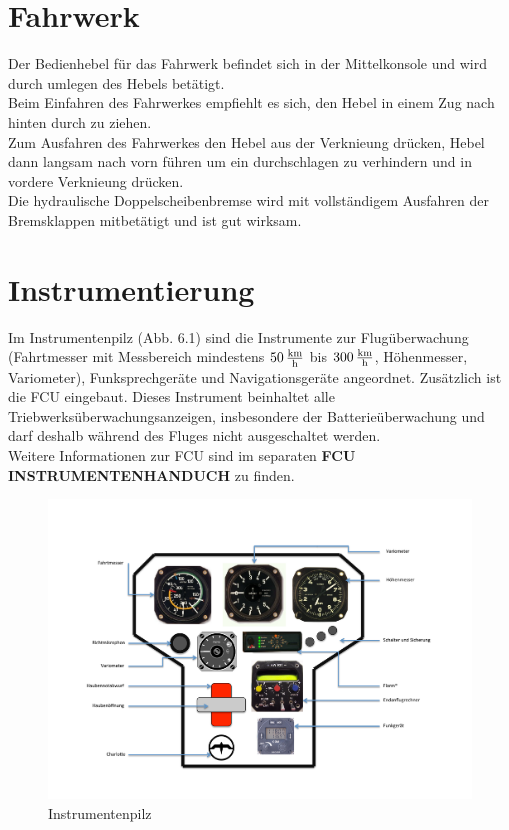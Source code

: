 \section{Fahrwerk}
Der Bedienhebel für das Fahrwerk befindet sich in der Mittelkonsole und wird durch umlegen des Hebels betätigt.\\
Beim Einfahren des Fahrwerkes empfiehlt es sich, den Hebel in einem Zug nach hinten durch zu ziehen.\\
Zum Ausfahren des Fahrwerkes den Hebel aus der Verknieung drücken, Hebel dann langsam nach vorn führen um ein durchschlagen zu verhindern und in vordere Verknieung drücken.\\
Die hydraulische Doppelscheibenbremse wird mit vollständigem Ausfahren der Bremsklappen mitbetätigt und ist gut wirksam.


\section{Instrumentierung}
Im Instrumentenpilz (Abb. 6.1) sind die Instrumente zur Flugüberwachung (Fahrtmesser mit Messbereich mindestens $\unit[50] {\frac{km}{h}}$ bis $\unit[300]{\frac{km}{h}}$, Höhenmesser, Variometer), Funksprechgeräte und Navigationsgeräte angeordnet.
Zusätzlich ist die FCU eingebaut. Dieses Instrument beinhaltet alle Triebwerksüberwachungsanzeigen, insbesondere der Batterieüberwachung und darf deshalb während des Fluges nicht ausgeschaltet werden.\\

Weitere Informationen zur FCU sind im separaten \textbf{FCU INSTRUMENTENHANDUCH} zu finden.\\

\begin{figure}[ht]
\includegraphics[angle=90,width=\textwidth]{bilder/instrumentenpilz.pdf}
\caption{Instrumentenpilz}
\end{figure}

